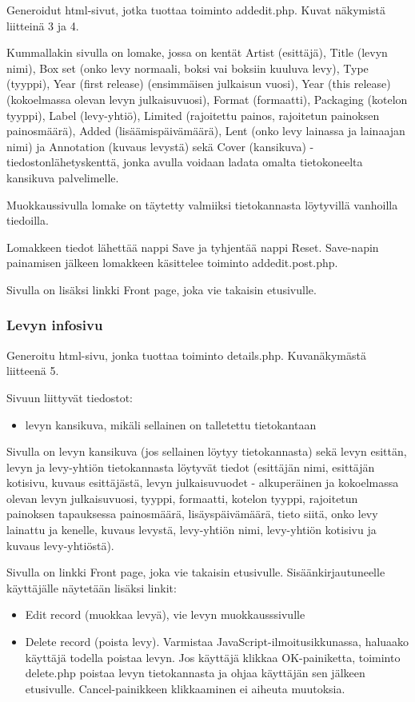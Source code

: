 \documentclass[a4paper,12pt]{report}
\begin{document}
Generoidut html-sivut, jotka tuottaa toiminto addedit.php. Kuvat näkymistä
liitteinä 3 ja 4.

Kummallakin sivulla on lomake, jossa on kentät Artist (esittäjä), Title
(levyn nimi), Box set (onko levy normaali, boksi vai boksiin kuuluva levy),
Type (tyyppi), Year (first release) (ensimmäisen julkaisun vuosi), Year
(this release) (kokoelmassa olevan levyn julkaisuvuosi), Format (formaatti),
Packaging (kotelon tyyppi), Label (levy-yhtiö), Limited (rajoitettu painos,
rajoitetun painoksen painosmäärä), Added (lisäämispäivämäärä), Lent (onko
levy lainassa ja lainaajan nimi) ja Annotation (kuvaus levystä) sekä Cover
(kansikuva) -tiedostonlähetyskenttä, jonka avulla voidaan ladata omalta
tietokoneelta kansikuva palvelimelle.

Muokkaussivulla lomake on täytetty valmiiksi tietokannasta löytyvillä
vanhoilla tiedoilla.

Lomakkeen tiedot lähettää nappi Save ja tyhjentää nappi Reset. Save-napin
painamisen jälkeen lomakkeen käsittelee toiminto addedit.post.php.

Sivulla on lisäksi linkki Front page, joka vie takaisin etusivulle.

\subsubsection{Levyn infosivu}

Generoitu html-sivu, jonka tuottaa toiminto details.php. Kuvanäkymästä
liitteenä 5.

Sivuun liittyvät tiedostot:
\begin{itemize}
  \item levyn kansikuva, mikäli sellainen on talletettu tietokantaan
\end{itemize}

Sivulla on levyn kansikuva (jos sellainen löytyy tietokannasta) sekä levyn
esittän, levyn ja levy-yhtiön tietokannasta löytyvät tiedot (esittäjän nimi,
esittäjän kotisivu, kuvaus esittäjästä, levyn julkaisuvuodet - alkuperäinen
ja kokoelmassa olevan levyn julkaisuvuosi, tyyppi, formaatti, kotelon
tyyppi, rajoitetun painoksen tapauksessa painosmäärä, lisäyspäivämäärä,
tieto siitä, onko levy lainattu ja kenelle, kuvaus levystä, levy-yhtiön
nimi, levy-yhtiön kotisivu ja kuvaus levy-yhtiöstä).

Sivulla on linkki Front page, joka vie takaisin etusivulle.
Sisäänkirjautuneelle käyttäjälle näytetään lisäksi linkit:

\begin{itemize}
  \item Edit record (muokkaa levyä),
		vie levyn muokkausssivulle
  \item Delete record (poista levy).  Varmistaa
    JavaScript-ilmoitusikkunassa, haluaako käyttäjä todella poistaa levyn.
    Jos käyttäjä klikkaa OK-painiketta, toiminto delete.php poistaa levyn
    tietokannasta ja ohjaa käyttäjän sen jälkeen etusivulle.
    Cancel-painikkeen klikkaaminen ei aiheuta muutoksia.
\end{itemize}
\end{document}
